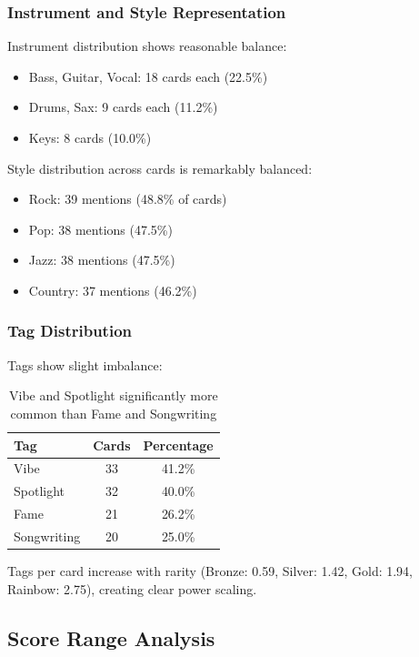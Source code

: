\documentclass[11pt,a4paper]{article}
\begin{document}
\subsubsection{Instrument and Style Representation}

Instrument distribution shows reasonable balance:

\begin{itemize}[itemsep=0pt]
    \item Bass, Guitar, Vocal: 18 cards each (22.5\%)
    \item Drums, Sax: 9 cards each (11.2\%)
    \item Keys: 8 cards (10.0\%)
\end{itemize}

Style distribution across cards is remarkably balanced:

\begin{itemize}[itemsep=0pt]
    \item Rock: 39 mentions (48.8\% of cards)
    \item Pop: 38 mentions (47.5\%)
    \item Jazz: 38 mentions (47.5\%)
    \item Country: 37 mentions (46.2\%)
\end{itemize}

\subsubsection{Tag Distribution}

Tags show slight imbalance:

\begin{table}[H]
\centering
\begin{tabular}{lcc}
\toprule
\textbf{Tag} & \textbf{Cards} & \textbf{Percentage} \\
\midrule
Vibe & 33 & 41.2\% \\
Spotlight & 32 & 40.0\% \\
Fame & 21 & 26.2\% \\
Songwriting & 20 & 25.0\% \\
\bottomrule
\end{tabular}
\caption{Vibe and Spotlight significantly more common than Fame and Songwriting}
\end{table}

Tags per card increase with rarity (Bronze: 0.59, Silver: 1.42, Gold: 1.94, Rainbow: 2.75), creating clear power scaling.

\subsection{Score Range Analysis}
\end{document}
